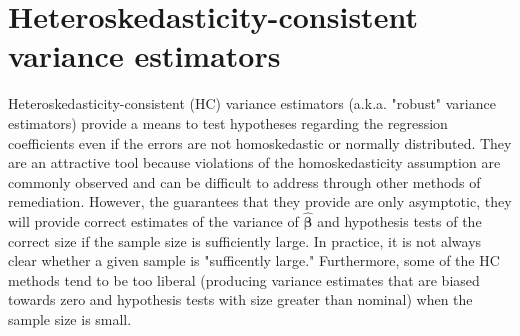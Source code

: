 \documentclass{article}\usepackage[]{graphicx}\usepackage[]{color}
\newcommand{\bs}{\boldsymbol}
\begin{document}
\section{Heteroskedasticity-consistent variance estimators}

Heteroskedasticity-consistent (HC) variance estimators (a.k.a. "robust" variance estimators) provide a means to test hypotheses regarding the regression coefficients even if the errors are not homoskedastic or normally distributed. They are an attractive tool because violations of the homoskedasticity assumption are commonly observed and can be difficult to address through other methods of remediation. However, the guarantees that they provide are only asymptotic, they will provide correct estimates of the variance of $\bs{\hat\beta}$ and hypothesis tests of the correct size if the sample size is sufficiently large. In practice, it is not always clear whether a given sample is "sufficently large." Furthermore, some of the HC methods tend to be too liberal (producing variance estimates that are biased towards zero and hypothesis tests with size greater than nominal) when the sample size is small. 
\end{document}
